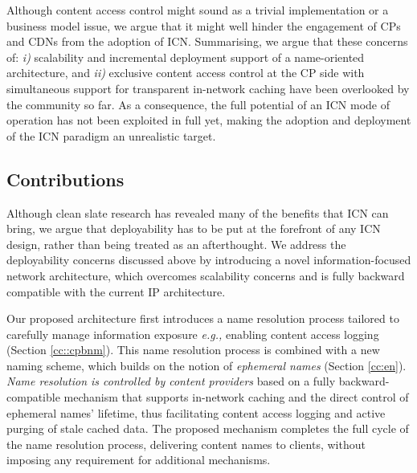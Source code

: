 \documentclass{sig-alternate}
\newcommand{\eg}{{\em e.g.,\/ }}
\begin{document}
 
Although content access control might sound as a trivial implementation or a business model issue, we argue that it might well hinder the engagement of CPs and CDNs from the adoption of ICN. Summarising, we argue that these concerns of: \textit{i)} scalability and incremental deployment support of a name-oriented architecture, and \textit{ii)} exclusive content access control at the CP side with simultaneous support for transparent in-network caching 
 have been overlooked by the community so far. As a consequence, the full potential of an ICN mode of operation has not been exploited in full yet, making the adoption and deployment of the ICN paradigm an unrealistic target.


\subsection{Contributions}


Although clean slate research has revealed many of the benefits that ICN can bring, we argue that deployability has to be put at the forefront of any ICN design, rather than being treated as an afterthought.
We address the deployability concerns discussed above by introducing a novel information-focused network architecture, which overcomes scalability concerns and is fully backward compatible with the current IP architecture.

Our proposed architecture first introduces a name resolution process tailored to carefully manage information exposure \eg enabling content access logging (Section \ref{cc::cpbnm}). This name resolution process is combined with a new naming scheme, which builds on the notion of \textit{ephemeral names} (Section \ref{cc:en}).
\textit{Name resolution is controlled by content providers} based on a fully backward-compatible mechanism that supports in-network caching and the direct control of ephemeral names' lifetime, thus facilitating content access logging and active purging of stale cached data.
The proposed mechanism completes the full cycle of the name resolution process, delivering content names to clients, without imposing any requirement for additional mechanisms.
\end{document}
